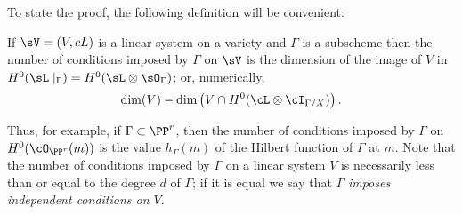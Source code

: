 To state the proof, the following definition will be convenient:

\begin{definition}
If $\sV = (V,cL)$ is a linear system on a variety and $\Gamma$ is a subscheme then the number of conditions
imposed by $\Gamma$ on $\sV$ is the dimension of the image of $V$ in $H^0(\sL\mid_\Gamma) = H^0(\sL \otimes \sO_\Gamma)$; or, numerically,
$$
\dim(V) - \dim \left(V \cap H^0(\cL\otimes \cI_{\Gamma/X}) \right).
$$\end{definition}

Thus, for example, if $\Gamma \subset \PP^r$, then the number of conditions imposed by $\Gamma$ on $H^0(\cO_{\PP^r}(m))$ is the value $h_\Gamma(m)$ of the Hilbert function of $\Gamma$ at $m$.
Note that the number of conditions imposed by $\Gamma$ on a linear system $V$ is necessarily less than or equal to the degree $d$ of $\Gamma$; if it is equal we say that $\Gamma$ \emph{imposes independent conditions on $V$}.

